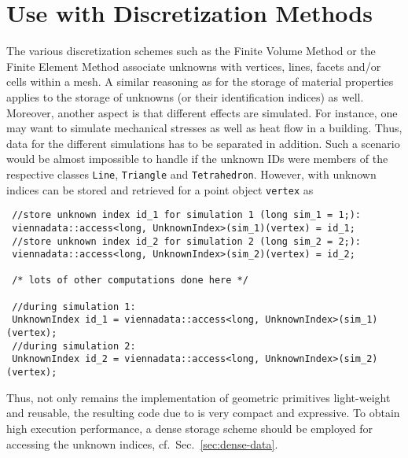 \section{Use with Discretization Methods}
The various discretization schemes such as the Finite Volume Method or the Finite Element Method associate unknowns with vertices, lines, facets and/or cells within a mesh.
A similar reasoning as for the storage of material properties applies to the storage of unknowns (or their identification indices) as well. Moreover, another aspect is
that different effects are simulated. For instance, one may want to simulate mechanical stresses as well as heat flow in a building. Thus, data for the different simulations
has to be separated in addition. Such a scenario would be almost impossible to handle if the unknown IDs were members of the respective classes \lstinline|Line|, \lstinline|Triangle| and \lstinline|Tetrahedron|. However, with {\ViennaData} unknown indices can be stored and retrieved for a point object \lstinline|vertex| as
\begin{lstlisting}
 //store unknown index id_1 for simulation 1 (long sim_1 = 1;):
 viennadata::access<long, UnknownIndex>(sim_1)(vertex) = id_1; 
 //store unknown index id_2 for simulation 2 (long sim_2 = 2;):
 viennadata::access<long, UnknownIndex>(sim_2)(vertex) = id_2; 

 /* lots of other computations done here */

 //during simulation 1:
 UnknownIndex id_1 = viennadata::access<long, UnknownIndex>(sim_1)(vertex); 
 //during simulation 2:
 UnknownIndex id_2 = viennadata::access<long, UnknownIndex>(sim_2)(vertex); 
\end{lstlisting}
Thus, not only remains the implementation of geometric primitives light-weight and reusable, the resulting code due to {\ViennaData} is very compact and expressive. 
To obtain high execution performance, a dense storage scheme should be employed for accessing the unknown indices, cf.~Sec.~\ref{sec:dense-data}.


